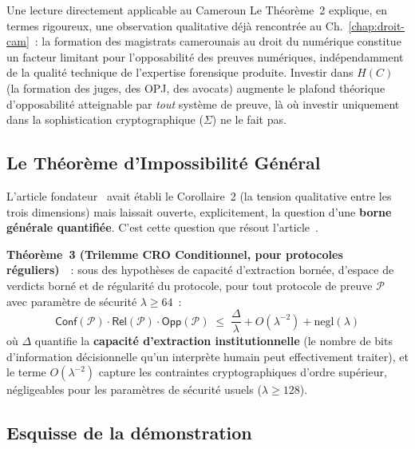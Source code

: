 \begin{boiteRemarque}{Une lecture directement applicable au Cameroun}
Le Théorème~2 explique, en termes rigoureux, une observation
qualitative déjà rencontrée au Ch.~\ref{chap:droit-cam}~: la
formation des magistrats camerounais au droit du numérique
constitue un facteur limitant pour l'opposabilité des preuves
numériques, indépendamment de la qualité technique de l'expertise
forensique produite. Investir dans $H(C)$ (la formation des juges,
des OPJ, des avocats) augmente le plafond théorique d'opposabilité
atteignable par \emph{tout} système de preuve, là où investir
uniquement dans la sophistication cryptographique ($\Sigma$) ne le
fait pas.
\end{boiteRemarque}

\subsection{Le Théorème d'Impossibilité Général}

L'article fondateur~\cite{minka2026clo} avait établi le Corollaire~2
(la tension qualitative entre les trois dimensions) mais laissait
ouverte, explicitement, la question d'une \textbf{borne générale
quantifiée}. C'est cette question que résout
l'article~\cite{minka2026conditional}.

\begin{boxjuris}
\textbf{Théorème~3 (Trilemme CRO Conditionnel, pour protocoles
réguliers)}~\cite{minka2026conditional}~: sous des hypothèses de
capacité d'extraction bornée, d'espace de verdicts borné et de
régularité du protocole, pour tout protocole de preuve $\mathcal{P}$
avec paramètre de sécurité $\lambda \geq 64$~:
\begin{equation}
\mathsf{Conf}(\mathcal{P}) \cdot \mathsf{Rel}(\mathcal{P}) \cdot
\mathsf{Opp}(\mathcal{P}) \;\leq\; \frac{\Delta}{\lambda} +
O(\lambda^{-2}) + \mathrm{negl}(\lambda)
\label{thm:trilemma-general}
\end{equation}
où $\Delta$ quantifie la \textbf{capacité d'extraction
institutionnelle} (le nombre de bits d'information décisionnelle
qu'un interprète humain peut effectivement traiter), et le terme
$O(\lambda^{-2})$ capture les contraintes cryptographiques d'ordre
supérieur, négligeables pour les paramètres de sécurité usuels
($\lambda \geq 128$).
\end{boxjuris}

\subsection{Esquisse de la démonstration}

